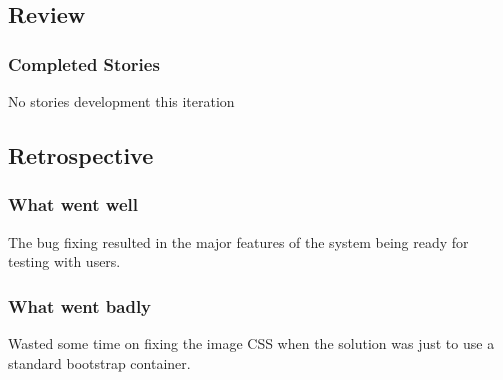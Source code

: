 \subsection{Review}
\subsubsection{Completed Stories}
No stories development this iteration

\subsection{Retrospective}
\subsubsection{What went well}
The bug fixing resulted in the major features of the system being ready for testing with users.
\subsubsection{What went badly}
Wasted some time on fixing the image CSS when the solution was just to use a standard bootstrap container.
\newpage
